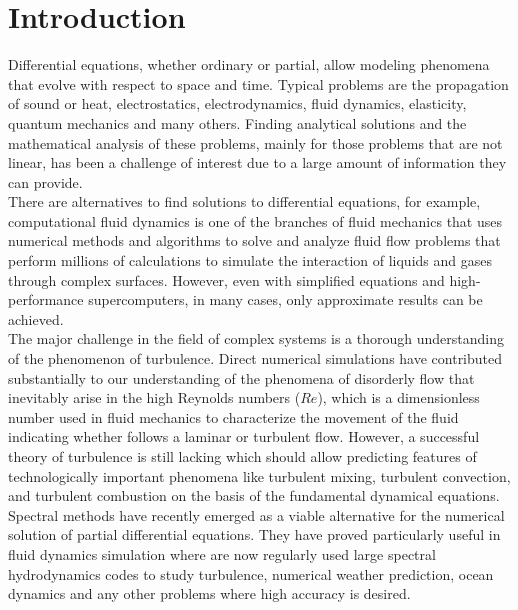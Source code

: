 \chapter{Introduction}
\label{Introduction}

	Differential equations, whether ordinary or partial, allow modeling phenomena that evolve with respect to space and time. Typical problems are the propagation of sound or heat, electrostatics, electrodynamics, fluid dynamics, elasticity, quantum mechanics and many others. Finding analytical solutions and the mathematical analysis of these problems, mainly for those problems that are not linear, has been a challenge of interest due to a large amount of information they can provide. \\  
	
	There are alternatives to find solutions to differential equations, for example, computational fluid dynamics is one of the branches of fluid mechanics that uses numerical methods and algorithms to solve and analyze fluid flow problems that perform millions of calculations to simulate the interaction of liquids and gases through complex surfaces. However, even with simplified equations and high-performance supercomputers, in many cases, only approximate results can be achieved. \\
	
	The major challenge in the field of complex systems is a thorough understanding of the phenomenon of turbulence. Direct numerical simulations have contributed substantially to our understanding of the phenomena of disorderly flow that inevitably arise in the high Reynolds numbers ($Re$), which is a dimensionless number used in fluid mechanics to characterize the movement of the fluid indicating whether follows a laminar or turbulent flow. However, a successful theory of turbulence is still lacking which should allow predicting features of technologically important phenomena like turbulent mixing, turbulent convection, and turbulent combustion on the basis of the fundamental dynamical equations.  \\
	
	Spectral methods have recently emerged as a viable alternative for the numerical solution of partial differential equations. They have proved particularly useful in fluid dynamics simulation where are now regularly used large spectral hydrodynamics codes to study turbulence, numerical weather prediction, ocean dynamics and any other problems where high accuracy is desired. \\
	
